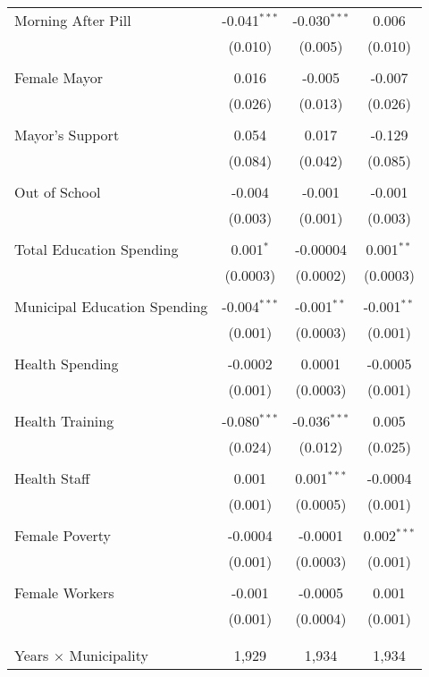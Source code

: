 \begin{table}[htpb!]
\begin{tabular}{@{\extracolsep{5pt}}lccc}
 Morning After Pill & -0.041$^{***}$ & -0.030$^{***}$ & 0.006 \\ 
  & (0.010) & (0.005) & (0.010) \\ 
  & & & \\ 
 Female Mayor & 0.016 & -0.005 & -0.007 \\ 
  & (0.026) & (0.013) & (0.026) \\ 
  & & & \\ 
 Mayor's Support & 0.054 & 0.017 & -0.129 \\ 
  & (0.084) & (0.042) & (0.085) \\ 
  & & & \\ 
 Out of School & -0.004 & -0.001 & -0.001 \\ 
  & (0.003) & (0.001) & (0.003) \\ 
  & & & \\ 
 Total Education Spending & 0.001$^{*}$ & -0.00004 & 0.001$^{**}$ \\ 
  & (0.0003) & (0.0002) & (0.0003) \\ 
  & & & \\ 
 Municipal Education Spending & -0.004$^{***}$ & -0.001$^{**}$ & -0.001$^{**}$ \\ 
  & (0.001) & (0.0003) & (0.001) \\ 
  & & & \\ 
 Health Spending & -0.0002 & 0.0001 & -0.0005 \\ 
  & (0.001) & (0.0003) & (0.001) \\ 
  & & & \\ 
 Health Training & -0.080$^{***}$ & -0.036$^{***}$ & 0.005 \\ 
  & (0.024) & (0.012) & (0.025) \\ 
  & & & \\ 
 Health Staff & 0.001 & 0.001$^{***}$ & -0.0004 \\ 
  & (0.001) & (0.0005) & (0.001) \\ 
  & & & \\ 
 Female Poverty & -0.0004 & -0.0001 & 0.002$^{***}$ \\ 
  & (0.001) & (0.0003) & (0.001) \\ 
  & & & \\ 
 Female Workers & -0.001 & -0.0005 & 0.001 \\ 
  & (0.001) & (0.0004) & (0.001) \\ 
  & & & \\ 
\hline \\[-1.8ex] 
Years $\times$ Municipality & 1,929 & 1,934 & 1,934 \\ 

\end{tabular}
\end{table}
